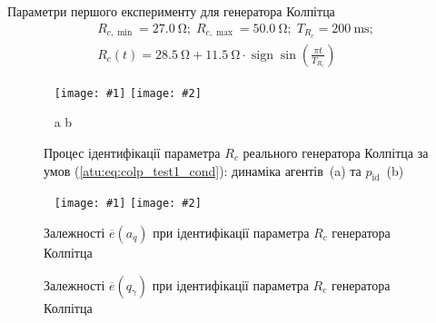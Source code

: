 \documentclass[14pt,handout,utf8]{beamer}
\DeclareMathOperator*{\sign}{sign}
\newlength\DDP
\newcommand{\ABlbl}{%
  \vspace{-2.9ex}
  \begin{center}
    ~ \hfill a \hfill\hfill b \hfill ~
  \end{center}
  \vspace{-2.0ex}
}
\newcommand{\PicDouble}[2]{%
 \begin{center}
    ~ \hfill
    \texttt{[image: \#1]}
    \hfill
    \texttt{[image: \#2]}
    \hfill ~
  \end{center}
  \ABlbl
}
\newcommand{\PicDoubleNL}[2]{%
 \begin{center}
    ~ \hfill
    \texttt{[image: \#1]}
    \hfill
    \texttt{[image: \#2]}
    \hfill ~
  \end{center}
}
\begin{document}
\begin{frame}
  \frametitle{~}

  Параметри першого експерименту для генератора Колпітца
  \begin{equation}
    \begin{array}{c}
      R_{c,\min} = \SI{27.0}{\ohm};
      \;
      R_{c,\max} = \SI{50.0}{\ohm};
      \;
      T_{R_c} = \SI{200}{\milli\second};
      \\
      R_c(t) = \SI{28.5}{\ohm} + \SI{11.5}{\ohm} \cdot \sign \sin \left(  \frac{\pi t}{T_{R_c}}  \right)
    \end{array}
    \label{atu:eq:colp_test1_cond}
  \end{equation}

  \begin{figure}[htb!]
    \PicDouble{../p6/p/r/colp_real_id-p_t_pi_ql3rlWvnAAW_real_d_0.png}{../p6/p/r/colp_real_id-p_t_p_ql3rlWvnAAW_real_d_0.png}
    \caption{Процес ідентифікації параметра $R_c$ реального генератора Колпітца за умов (\ref{atu:eq:colp_test1_cond}): динаміка агентів~(a) та $p_\mathrm{id}$~(b)}
    \label{atu:f:colp_r_id_1}
  \end{figure}

  \begin{figure}[htb!]
    \PicDoubleNL{../p6/p/r/colp_real_id-p_a_q_d_0.png}{../p6/p/r/colp_real_id-p_q_gamma_d_0.png}
    \parbox[t]{\DDP} {
      \caption{Залежності $\overline{e} (a_q) $ при ідентифікації параметра $ R_c $ генератора Колпітца}
      \label{atu:f:colp_real_id_p_a_q_d_0}
    }
    \hfill
    \parbox[t]{\DDP} {
      \caption{Залежності $ \overline{e} (q_\gamma) $ при ідентифікації параметра $ R_c $ генератора Колпітца}
      \label{atu:f:colp_real_id_p_q_gamma_d_0}
    }
  \end{figure}


\end{frame}


\end{document}
